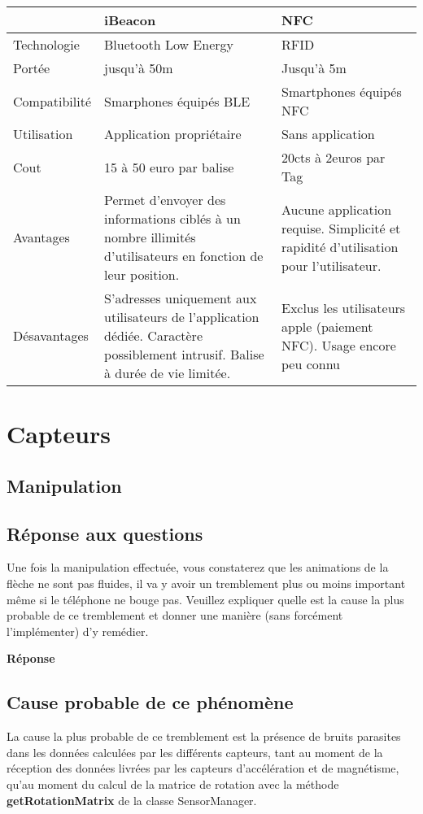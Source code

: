 \documentclass[francais,12pt]{article}
\begin{document}
	
		\begin{tabular}{|l|p{6cm}|p{6cm}|}
		\hline 
		\rowcolor{lightgray}& iBeacon & NFC \\ 
		\hline 
		Technologie & Bluetooth Low Energy  & RFID  \\ 
		\hline 
		Portée & jusqu'à 50m  & Jusqu'à 5m \\ 
		\hline 
		Compatibilité & Smarphones équipés BLE  & Smartphones équipés NFC  \\ 
		\hline 
		Utilisation & Application propriétaire & Sans application \\ 
		\hline 
		Cout &  15 à 50 euro par balise & 20cts à 2euros par Tag \\ 
		\hline 
		Avantages & Permet d'envoyer des informations ciblés à un nombre illimités d'utilisateurs en fonction de leur position.  & Aucune application requise. Simplicité et rapidité d'utilisation pour l'utilisateur. \\ 
		\hline 
		Désavantages & S'adresses uniquement aux utilisateurs de l'application dédiée. Caractère possiblement intrusif. Balise à durée de vie limitée. & Exclus les utilisateurs apple (paiement NFC). Usage encore peu connu \\ 
		\hline 
	\end{tabular} 
	
	\section*{Capteurs}
	\subsection*{Manipulation}
	\subsection*{Réponse aux questions}
	Une fois la manipulation effectuée, vous constaterez que les animations de la flèche ne sont pas fluides, il va y avoir un tremblement plus ou moins important même si le téléphone ne bouge pas. Veuillez expliquer quelle est la cause la plus probable de ce tremblement et donner une manière (sans forcément l’implémenter) d’y remédier. 
	
	{\color[rgb]{0,0.5,0.23}\textbf{Réponse}}
	
	\subsection*{Cause probable de ce phénomène}
	La cause la plus probable de ce tremblement est la présence de bruits parasites dans les données calculées par les différents capteurs, tant au moment de la réception des données livrées par les capteurs d'accélération et de magnétisme, qu'au moment du calcul de la matrice de rotation avec la méthode \textbf{getRotationMatrix} de la classe SensorManager. 
	
\end{document}
